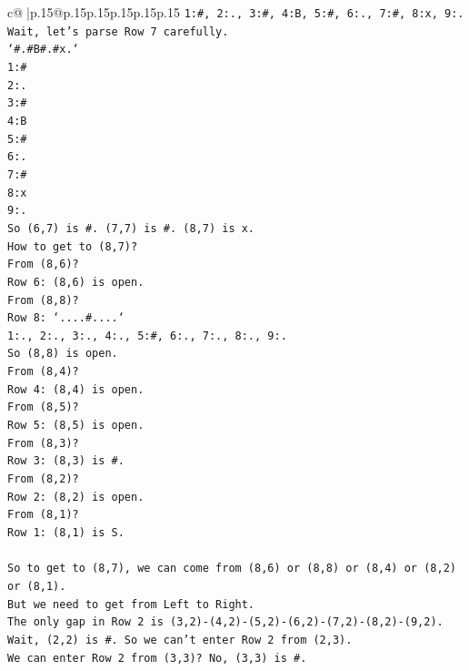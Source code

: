 \documentclass{article}
\begin{document}
{\begin{supertabular}{c@{$\;$}|p{.15\linewidth}@{}p{.15\linewidth}p{.15\linewidth}p{.15\linewidth}p{.15\linewidth}p{.15\linewidth}}
{{{\texttt{1:\#, 2:., 3:\#, 4:B, 5:\#, 6:., 7:\#, 8:x, 9:.} \\
\texttt{Wait, let's parse Row 7 carefully.} \\
\texttt{`\#.\#B\#.\#x.`} \\
\texttt{1:\#} \\
\texttt{2:.} \\
\texttt{3:\#} \\
\texttt{4:B} \\
\texttt{5:\#} \\
\texttt{6:.} \\
\texttt{7:\#} \\
\texttt{8:x} \\
\texttt{9:.} \\
\texttt{So (6,7) is \#. (7,7) is \#. (8,7) is x.} \\
\texttt{How to get to (8,7)?} \\
\texttt{From (8,6)?} \\
\texttt{Row 6: (8,6) is open.} \\
\texttt{From (8,8)?} \\
\texttt{Row 8: `....\#....`} \\
\texttt{1:., 2:., 3:., 4:., 5:\#, 6:., 7:., 8:., 9:.} \\
\texttt{So (8,8) is open.} \\
\texttt{From (8,4)?} \\
\texttt{Row 4: (8,4) is open.} \\
\texttt{From (8,5)?} \\
\texttt{Row 5: (8,5) is open.} \\
\texttt{From (8,3)?} \\
\texttt{Row 3: (8,3) is \#.} \\
\texttt{From (8,2)?} \\
\texttt{Row 2: (8,2) is open.} \\
\texttt{From (8,1)?} \\
\texttt{Row 1: (8,1) is S.} \\
\\ 
\texttt{So to get to (8,7), we can come from (8,6) or (8,8) or (8,4) or (8,2) or (8,1).} \\
\texttt{But we need to get from Left to Right.} \\
\texttt{The only gap in Row 2 is (3,2){-}(4,2){-}(5,2){-}(6,2){-}(7,2){-}(8,2){-}(9,2).} \\
\texttt{Wait, (2,2) is \#. So we can't enter Row 2 from (2,3).} \\
\texttt{We can enter Row 2 from (3,3)? No, (3,3) is \#.} \\
}}}
\end{supertabular}}
\end{document}
